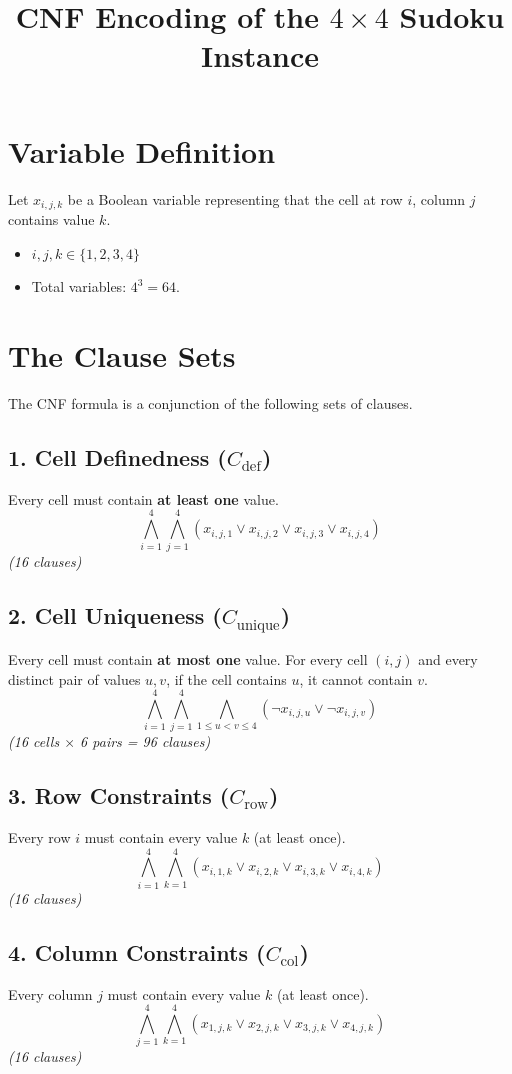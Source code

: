 \documentclass[12pt,a4paper]{article}
\title{\textbf{CNF Encoding of the $4 \times 4$ Sudoku Instance}}
\author{}
\date{}
\begin{document}
\maketitle

\section{Variable Definition}
Let $x_{i,j,k}$ be a Boolean variable representing that the cell at row $i$, column $j$ contains value $k$.
\begin{itemize}
    \item $i, j, k \in \{1, 2, 3, 4\}$
    \item Total variables: $4^3 = 64$.
\end{itemize}

\section{The Clause Sets}
The CNF formula is a conjunction of the following sets of clauses.

\subsection{1. Cell Definedness ($C_{\text{def}}$)}
Every cell must contain \textbf{at least one} value.
$$ \bigwedge_{i=1}^4 \bigwedge_{j=1}^4 \left( x_{i,j,1} \lor x_{i,j,2} \lor x_{i,j,3} \lor x_{i,j,4} \right) $$
\textit{(16 clauses)}

\subsection{2. Cell Uniqueness ($C_{\text{unique}}$)}
Every cell must contain \textbf{at most one} value. For every cell $(i,j)$ and every distinct pair of values $u, v$, if the cell contains $u$, it cannot contain $v$.
$$ \bigwedge_{i=1}^4 \bigwedge_{j=1}^4 \bigwedge_{1 \le u < v \le 4} \left( \neg x_{i,j,u} \lor \neg x_{i,j,v} \right) $$
\textit{(16 cells $\times$ 6 pairs = 96 clauses)}

\subsection{3. Row Constraints ($C_{\text{row}}$)}
Every row $i$ must contain every value $k$ (at least once).
$$ \bigwedge_{i=1}^4 \bigwedge_{k=1}^4 \left( x_{i,1,k} \lor x_{i,2,k} \lor x_{i,3,k} \lor x_{i,4,k} \right) $$
\textit{(16 clauses)}

\subsection{4. Column Constraints ($C_{\text{col}}$)}
Every column $j$ must contain every value $k$ (at least once).
$$ \bigwedge_{j=1}^4 \bigwedge_{k=1}^4 \left( x_{1,j,k} \lor x_{2,j,k} \lor x_{3,j,k} \lor x_{4,j,k} \right) $$
\textit{(16 clauses)}
\end{document}
